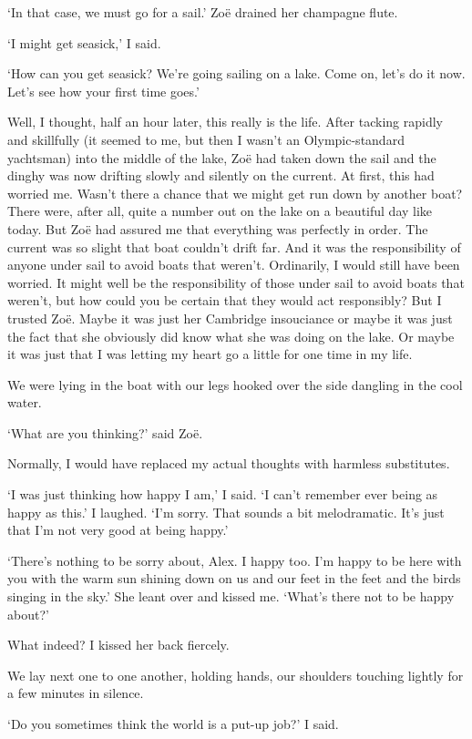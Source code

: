 `In that case, we must go for a sail.' Zoë drained her champagne
flute.

`I might get seasick,' I said.

`How can you get seasick? We're going sailing on a lake. Come on,
let's do it now. Let's see how your first time goes.'

Well, I thought, half an hour later, this really is the life. After
tacking rapidly and skillfully (it seemed to me, but then I wasn't
an Olympic-standard yachtsman) into the middle of the lake, Zoë
had taken down the sail and the dinghy was now drifting slowly and
silently on the current. At first, this had worried me. Wasn't there
a chance that we might get run down by another boat? There were,
after all, quite a number out on the lake on a beautiful day like
today. But Zoë had assured me that everything was perfectly in
order. The current was so slight that boat couldn't drift far. And
it was the responsibility of anyone under sail to avoid boats that
weren't. Ordinarily, I would still have been worried. It might well
be the responsibility of those under sail to avoid boats that
weren't, but how could you be certain that they would act
responsibly? But I trusted Zoë. Maybe it was just her Cambridge
insouciance or maybe it was just the fact that she obviously did
know what she was doing on the lake. Or maybe it was just that I was
letting my heart go a little for one time in my life.

We were lying in the boat with our legs hooked over the side
dangling in the cool water.

`What are you thinking?' said Zoë.

Normally, I would have replaced my actual thoughts with harmless
substitutes.

`I was just thinking how happy I am,' I said. `I can't remember
ever being as happy as this.' I laughed. `I'm sorry. That sounds a
bit melodramatic. It's just that I'm not very good at being happy.'

`There's nothing to be sorry about, Alex. I happy too. I'm happy to
be here with you with the warm sun shining down on us and our feet
in the feet and the birds singing in the sky.' She leant over and
kissed me. `What's there not to be happy about?'

What indeed? I kissed her back fiercely.

We lay next one to one another, holding hands, our shoulders
touching lightly for a few minutes in silence.

`Do you sometimes think the world is a put-up job?' I said.

